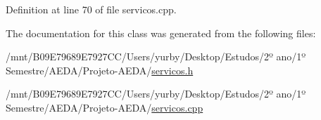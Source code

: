 Definition at line 70 of file servicos.\+cpp.



The documentation for this class was generated from the following files\+:\begin{DoxyCompactItemize}
\item 
/mnt/\+B09\+E79689\+E7927\+C\+C/\+Users/yurby/\+Desktop/\+Estudos/2º ano/1º Semestre/\+A\+E\+D\+A/\+Projeto-\/\+A\+E\+D\+A/\hyperlink{servicos_8h}{servicos.\+h}\item 
/mnt/\+B09\+E79689\+E7927\+C\+C/\+Users/yurby/\+Desktop/\+Estudos/2º ano/1º Semestre/\+A\+E\+D\+A/\+Projeto-\/\+A\+E\+D\+A/\hyperlink{servicos_8cpp}{servicos.\+cpp}\end{DoxyCompactItemize}
